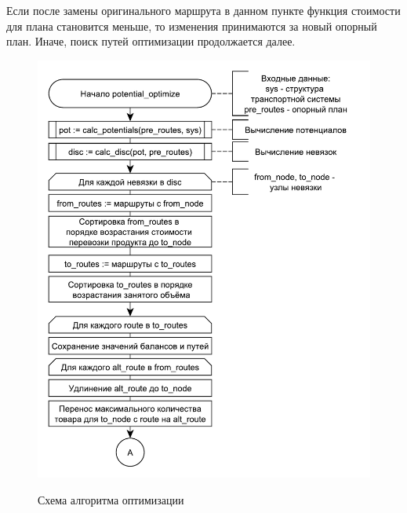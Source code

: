 Если после замены оригинального маршрута в данном пункте функция стоимости для плана становится меньше, то изменения принимаются за новый опорный план. Иначе, поиск путей оптимизации продолжается далее.

\begin{figure}[h]
	\begin{center}
		{\includegraphics[scale=0.8, angle=0, page=1]{img/potential_optimize_1.pdf}}
		\caption{Схема алгоритма оптимизации}
		\label{alg:potential_1}
	\end{center}
\end{figure}

